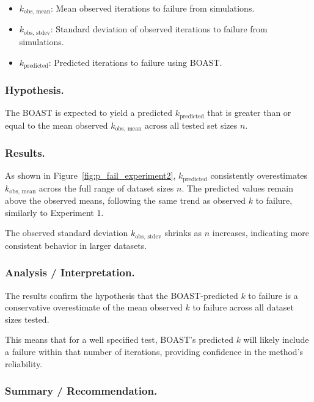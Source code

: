         \begin{itemize}
            \item $k_\text{obs, mean}$: Mean observed iterations to failure from simulations.  
            \item $k_\text{obs, stdev}$: Standard deviation of observed iterations to failure from simulations.  
            \item $k_\text{predicted}$: Predicted iterations to failure using BOAST.
        \end{itemize}

    \subsubsection{Hypothesis.}

        The BOAST is expected to yield a predicted $k_\text{predicted}$ that is greater than or equal to the mean observed $k_\text{obs, mean}$ across all tested set sizes $n$.

    \subsubsection{Results.}

        As shown in Figure~\ref{fig:p_fail_experiment2}, $k_{\text{predicted}}$ consistently overestimates $k_{\text{obs, mean}}$ across the full range of dataset sizes $n$.
        The predicted values remain above the observed means, following the same trend as observed $k$ to failure, similarly to Experiment 1.

        The observed standard deviation $k_{\text{obs, stdev}}$ shrinks as $n$ increases, indicating more consistent behavior in larger datasets.

    \subsubsection{Analysis / Interpretation.}

        The results confirm the hypothesis that the BOAST-predicted $k$ to failure is a conservative overestimate of the mean observed $k$ to failure across all
        dataset sizes tested.

        This means that for a well specified test, BOAST's predicted $k$ will likely include a failure within that number of iterations, providing confidence in
        the method's reliability.

    \subsubsection{Summary / Recommendation.}

